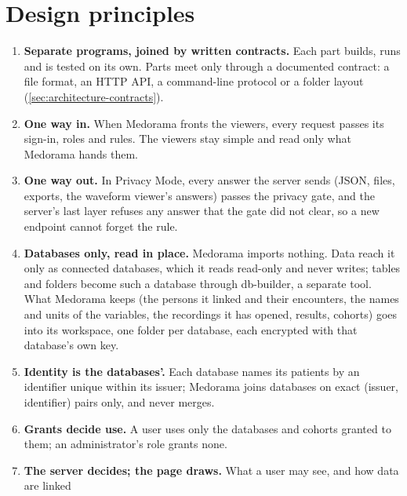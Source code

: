 
\section{Design principles}
\label{sec:architecture-principles}

\begin{enumerate}
\item \textbf{Separate programs, joined by written contracts.} Each part builds, runs and is
  tested on its own. Parts meet only through a documented contract: a file format, an HTTP API,
  a command-line protocol or a folder layout (\cref{sec:architecture-contracts}).
\item \textbf{One way in.} When Medorama fronts the viewers, every request passes its sign-in,
  roles and rules. The viewers stay simple and read only what Medorama hands them.
\item \textbf{One way out.} In Privacy Mode, every answer the server sends (JSON, files, exports, the waveform viewer's answers) passes the
  privacy gate, and the server's last layer refuses any answer that the gate did not clear, so a
  new endpoint cannot forget the rule.
\item \textbf{Databases only, read in place.} Medorama imports nothing. Data reach it only as
  connected databases, which it reads read-only and never writes; tables and folders become such a
  database through db-builder, a separate tool. What Medorama keeps (the persons it linked and
  their encounters, the names and units of the variables, the recordings it has opened, results,
  cohorts) goes into its workspace, one folder per
  database, each encrypted with that database's own key.
\item \textbf{Identity is the databases'.} Each database names its patients by an identifier
  unique within its issuer; Medorama joins databases on exact (issuer, identifier) pairs only,
  and never merges.
\item \textbf{Grants decide use.} A user uses only the databases and cohorts granted to them; an
  administrator's role grants none.
\item \textbf{The server decides; the page draws.} What a user may see, and how data are linked

\end{enumerate}
